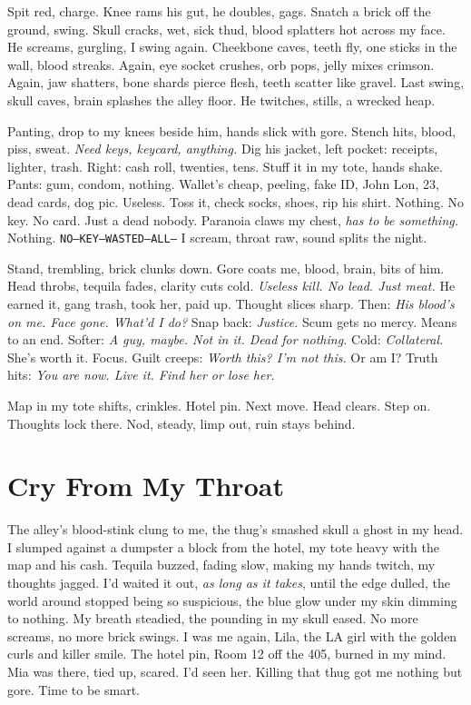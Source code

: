 \documentclass[12pt,oneside]{book} %
\newcommand{\note}[1]{\texttt{#1}}
\begin{document}
Spit red, charge. Knee rams his gut, he doubles, gags. Snatch a brick off the ground, swing. Skull cracks, wet, sick thud, blood splatters hot across my face. He screams, gurgling, I swing again. Cheekbone caves, teeth fly, one sticks in the wall, blood streaks. Again, eye socket crushes, orb pops, jelly mixes crimson. Again, jaw shatters, bone shards pierce flesh, teeth scatter like gravel. Last swing, skull caves, brain splashes the alley floor. He twitches, stills, a wrecked heap.

Panting, drop to my knees beside him, hands slick with gore. Stench hits, blood, piss, sweat. \textit{Need keys, keycard, anything.} Dig his jacket, left pocket: receipts, lighter, trash. Right: cash roll, twenties, tens. Stuff it in my tote, hands shake. Pants: gum, condom, nothing. Wallet’s cheap, peeling, fake ID, \textnormal{John Lon}, 23, dead cards, dog pic. Useless. Toss it, check socks, shoes, rip his shirt. Nothing. No key. No card. Just a dead nobody. Paranoia claws my chest, \textit{has to be something.} Nothing. \note{NO—KEY—WASTED—ALL—} I scream, throat raw, sound splits the night.

Stand, trembling, brick clunks down. Gore coats me, blood, brain, bits of him. Head throbs, tequila fades, clarity cuts cold. \textit{Useless kill. No lead. Just meat.} He earned it, gang trash, took her, paid up. Thought slices sharp. Then: \textit{His blood’s on me. Face gone. What’d I do?} Snap back: \textit{Justice.} Scum gets no mercy. Means to an end. Softer: \textit{A guy, maybe. Not in it. Dead for nothing.} Cold: \textit{Collateral.} She’s worth it. Focus. Guilt creeps: \textit{Worth this? I’m not this.} Or am I? Truth hits: \textit{You are now. Live it. Find her or lose her.}

Map in my tote shifts, crinkles. Hotel pin. Next move. Head clears. Step on. Thoughts lock there. Nod, steady, limp out, ruin stays behind.

\chapter{Cry From My Throat}

The alley’s blood-stink clung to me, the thug’s smashed skull a ghost in my head. I slumped against a dumpster a block from the hotel, my tote heavy with the map and his cash. Tequila buzzed, fading slow, making my hands twitch, my thoughts jagged. I’d waited it out, \textit{as long as it takes}, until the edge dulled, the world around stopped being so suspicious, the blue glow under my skin dimming to nothing. My breath steadied, the pounding in my skull eased. No more screams, no more brick swings. I was me again, Lila, the LA girl with the golden curls and killer smile. The hotel pin, Room 12 off the 405, burned in my mind. Mia was there, tied up, scared. I’d seen her. Killing that thug got me nothing but gore. Time to be smart.
\end{document}
